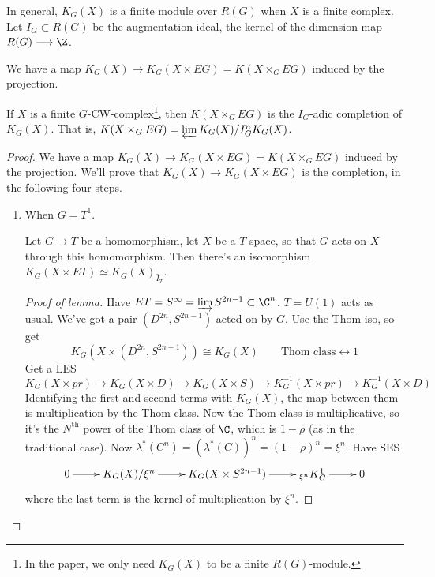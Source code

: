 \documentclass[11pt]{article}
\begin{document}
\begin{GuozhenEqKthy}
In general, $K_G(X)$ is a finite module over $R(G)$ when $X$ is a finite complex. %
Let $I_G\subset R(G)$ be the augmentation ideal, the kernel of the dimension map $R(G)\to\Z$.

We have a map $K_G(X)\to K_G(X\times EG)=K(X\times_G EG)$ induced by the projection.
\begin{thm*}
If $X$ is a finite $G$-CW-complex\footnote{In the paper, we only need $K_G(X)$ to be a finite $R(G)$-module.},
then $K(X\times_G EG)$ is the $I_G$-adic completion of $K_G(X)$. That is, $K(X\times_G EG)=\varprojlim K_G(X)/I_G^nK_G(X)$.
\end{thm*}
\begin{proof}
We have a map $K_G(X)\to K_G(X\times EG)=K(X\times_G EG)$ induced by the projection.
We'll prove that $K_G(X)\to K_G(X\times EG)$ is the completion, in the following four steps.
\begin{enumerate}
\item When $G=T^1$.
\begin{lem*}
Let $G\to T$ be a homomorphism, let $X$ be a $T$-space, so that $G$ acts on $X$ through this homomorphism. Then there's an isomorphism $K_G(X\times ET)\simeq K_G(X)_{\hat I_{T}}$.
\end{lem*}
\begin{proof}[Proof of lemma]
Have $ET=S^\infty=\varinjlim S^{2n-1}\subset \C^n$. $T=U(1)$ acts as usual. We've got a pair $(D^{2n},S^{2n-1})$ acted on by $G$.
 Use the Thom iso, so get
\[K_G(X\times(D^{2n},S^{2n-1}))\cong K_G(X)\qquad    \text{Thom class}\longleftrightarrow 1\]
Get a LES
\[K_G(X\times pr)\to K_G(X\times D)\to K_G(X\times S)\to K_G^{-1}(X\times pr)\to K_G^{-1}(X\times D)\]
Identifying the first and second terms with $K_G(X)$, the map between them is multiplication by the Thom class. Now the Thom class is multiplicative, so it's the $N^\text{th}$ power of the Thom class of $\C$, which is $1-\rho$ (as in the traditional case).
Now $\lambda^*(C^n)=(\lambda^*(C))^n=(1-\rho)^n=\xi^n$. Have SES
\[\xymatrix{
0\ar[r] &K_G(X)/\xi^n\ar[r] &K_G(X\times S^{2n-1})\ar[r]& {_{\xi^n}K_G^1}\ar[r]&0
}\]
where the last term is the kernel of multiplication by $\xi^n$.


\end{proof}
\end{enumerate}
\end{proof}
\end{GuozhenEqKthy}
\end{document}
